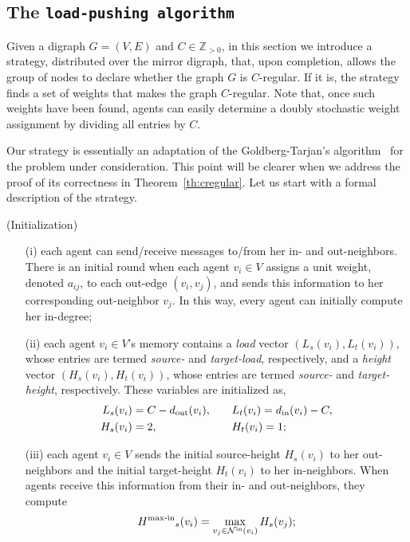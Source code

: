 \documentclass[final]{siamltex}
\begin{document}
\subsection{The {\texttt{load-pushing algorithm}\xspace}}

Given a digraph $ G=(V,E)$ and $C \in {\mathbb{Z}_{>0}}$, in this
section we introduce a strategy, distributed over the mirror digraph,
that, upon completion, allows the group of nodes to declare whether
the graph $G$ is $ C $-regular. If it is, the strategy finds a set of
weights that makes the graph $C$-regular.  Note that, once such
weights have been found, agents can easily determine a doubly
stochastic weight assignment by dividing all entries by $C$.

Our strategy is essentially an adaptation of the Goldberg-Tarjan's
algorithm~\cite{AVG-RET:88} for the problem under consideration. This
point will be clearer when we address the proof of its correctness in
Theorem~\ref{th:cregular}.  Let us start with a formal description of
the strategy.

(Initialization)
\begin{enumerate}
\item[(i)] each agent can send/receive messages to/from her in- and
  out-neighbors. There is an initial round when each agent $v_i \in V$
  assigns a unit weight, denoted $ a_{ij}$, to each out-edge
  $(v_i,v_j)$, and sends this information to her corresponding
  out-neighbor $v_j$. In this way, every agent can initially compute
  her in-degree;

\item[(ii)] each agent $v_i \in V$'s memory contains a \emph{load}
  vector $ (L_s(v_i),L_t(v_i))$, whose entries are termed
  \emph{source-} and \emph{target-load}, respectively, and a
  \emph{height} vector $(H_s(v_i),H_t(v_i)) $, whose entries are
  termed \emph{source-} and \emph{target-height}, respectively. These
  variables are initialized as,
  \begin{alignat*}{2}
    L_s(v_i) & = C-{{{d}_{\textup{{out}}}}}(v_i) , \quad && L_t(v_i) = {{{d}_{\textup{{in}}}}}(v_i)-C ,
    \\
    H_s(v_i) & =2 , \quad && H_t(v_i)=1 ;
  \end{alignat*}

\item[(iii)] each agent $ v_i\in V $ sends the initial source-height $
  H_s(v_i) $ to her out-neighbors and the initial target-height $
  H_t(v_i) $ to her in-neighbors.  When agents receive this
  information from their in- and out-neighbors, they compute
  \begin{align*}
    {{H}^{\textup{{max-in}}}}_s(v_i)=\max_{v_j \in {{{\mathcal{N}}^{\textup{{in}}}}}(v_i)} H_s(v_j) ;
  \end{align*}
\end{enumerate}
\end{document}
